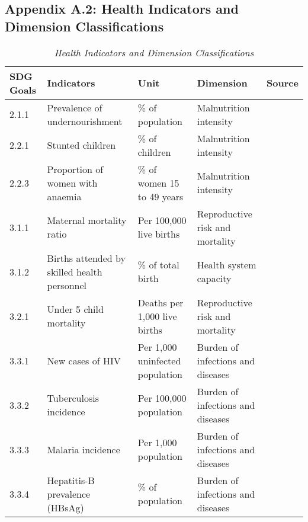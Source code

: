 \begin{sidewaystable}
\subsection*{Appendix A.2: Health Indicators and Dimension Classifications}
    \caption{\textit{Health Indicators and Dimension Classifications}}
    \small
    \begin{tabularx}{\textwidth}{|p{1cm}|p{7.4cm}|p{5.5cm}|p{5.8cm}|p{2.7cm}|}
        \hline
        \textbf{SDG Goals} & \textbf{Indicators} & \textbf{Unit} & \textbf{Dimension} & \textbf{Source} \\
        \hline
        2.1.1 & Prevalence of undernourishment & \% of population & Malnutrition intensity & \textcite{wdi_world_2023}\\
        \hline
        2.2.1 & Stunted children & \% of children & Malnutrition intensity & \textcite{wdi_world_2023}\\
        \hline
        2.2.3 & Proportion of women with anaemia & \% of women 15 to 49 years & Malnutrition intensity & \textcite{wdi_world_2023}\\
        \hline
        3.1.1 & Maternal mortality ratio & Per 100,000 live births & Reproductive risk and mortality & \textcite{unsdg_sustainable_2023}\\
        \hline
        3.1.2 & Births attended by skilled health personnel & \% of total birth & Health system capacity & \textcite{unsdg_sustainable_2023} \\
        \hline
        3.2.1 & Under 5 child mortality & Deaths per 1,000 live births & Reproductive risk and mortality & \textcite{wdi_world_2023} \\
        \hline
        3.3.1 & New cases of HIV & Per 1,000 uninfected population & Burden of infections and diseases & \textcite{wdi_world_2023} \\
        \hline
        3.3.2 & Tuberculosis incidence & Per 100,000 population & Burden of infections and diseases & \textcite{unsdg_sustainable_2023} \\
        \hline
        3.3.3 & Malaria incidence & Per 1,000 population & Burden of infections and diseases & \textcite{unsdg_sustainable_2023} \\
        \hline
        3.3.4 & Hepatitis-B prevalence (HBsAg) & \% of population & Burden of infections and diseases & \textcite{unsdg_sustainable_2023} \\

\end{tabularx}
\end{sidewaystable}
